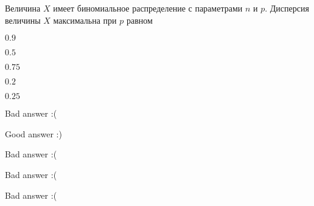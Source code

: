 
\begin{question}
Величина \(X\) имеет биномиальное распределение с параметрами \(n\) и
\(p\). Дисперсия величины \(X\) максимальна при \(p\) равном
\begin{answerlist}
  \item \(0.9\)
  \item \(0.5\)
  \item \(0.75\)
  \item \(0.2\)
  \item \(0.25\)
\end{answerlist}
\end{question}

\begin{solution}
\begin{answerlist}
  \item Bad answer :(
  \item Good answer :)
  \item Bad answer :(
  \item Bad answer :(
  \item Bad answer :(
\end{answerlist}
\end{solution}

